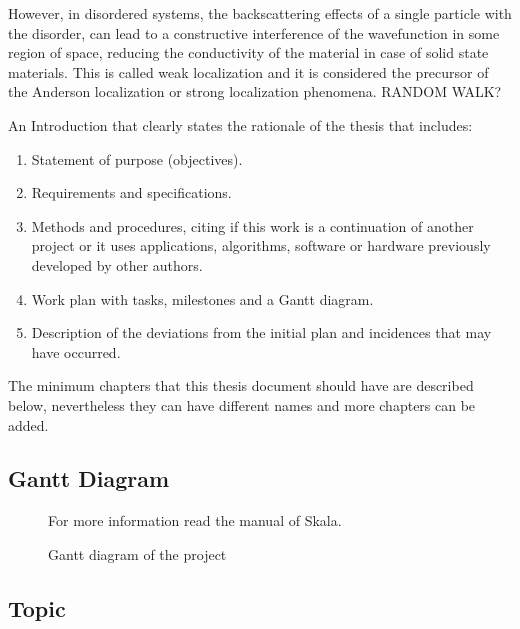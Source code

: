 However, in disordered systems, the backscattering effects of a single particle with the disorder, can lead to a constructive interference of the wavefunction in some region of space, reducing the conductivity of the material in case of solid state materials. This is called weak localization and it is considered the precursor of the Anderson localization or strong localization phenomena. RANDOM WALK?



{An Introduction that clearly states the rationale of the thesis that includes:}

\begin{enumerate}
\item {Statement of purpose (objectives).}
\item {Requirements and specifications.}
\item {Methods and procedures, citing if this work is a continuation of another project or it uses applications, algorithms,
software or hardware previously developed by other authors.}
\item {Work plan with tasks, milestones and a Gantt diagram.}
\item {Description of the deviations from the initial plan and incidences that may have occurred. }
\end{enumerate}

\bigskip

{The minimum chapters that this thesis document should have are described below, nevertheless they can have different
names and more chapters can be added.}

\bigskip

\subsection{Gantt Diagram}
\label{ssec:gantt}
\begin{figure}[H]
    \centering
    
    \caption[Project's Gantt diagram]{\footnotesize{Gantt diagram of the project}}
    \label{fig:gantt}
    For more information read the manual \cite{skalagantt} of Skala.
\end{figure}

\bigskip

\subsection{Topic}
